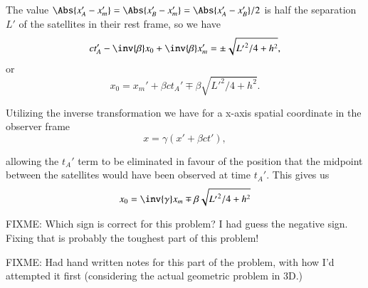 {The value \(\Abs{x_A' - x_m'} = \Abs{x_B' - x_m'} = \Abs{x_A' - x_B'}/2\) is half the separation \(L'\) of the satellites in their rest frame, so we have
%
\begin{equation}\label{eqn:relElectroDynProblemSet1:1420}
c t_A' -\inv{\beta} x_0 + \inv{\beta} x_m' = \pm \sqrt{{L'}^2/4 + h^2},
\end{equation}
or
\begin{equation}\label{eqn:relElectroDynProblemSet1:1440}
x_0 = x_m' + \beta c t_A' \mp \beta \sqrt{{L'}^2/4 + h^2}.
\end{equation}

Utilizing the inverse transformation we have for a x-axis spatial coordinate in the observer frame
%
\begin{equation}\label{eqn:relElectroDynProblemSet1:1460}
x = \gamma ( x' + \beta c t'),
\end{equation}

allowing the \(t_A'\) term to be eliminated in favour of the position that the midpoint between the satellites would have been observed at time \(t_A'\).  This gives us
%
\begin{equation}\label{eqn:relElectroDynProblemSet1:1480}
x_0 = \inv{\gamma} x_m \mp \beta \sqrt{{L'}^2/4 + h^2}
\end{equation}

FIXME: Which sign is correct for this problem?  I had guess the negative sign.  Fixing that is probably the toughest part of this problem!


FIXME: Had hand written notes for this part of the problem, with how I'd attempted it first (considering the actual geometric problem in 3D.)

} %

